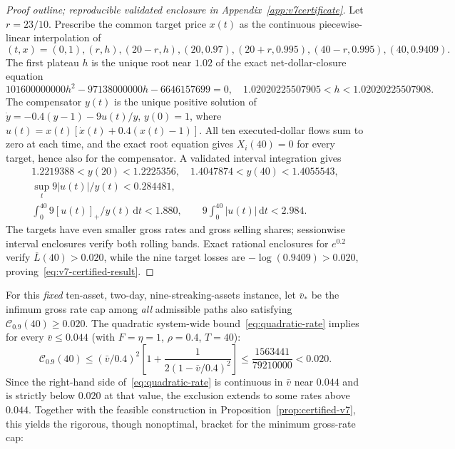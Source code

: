 \documentclass[11pt]{article}
\numberwithin{equation}{section}
\theoremstyle{definition}
\theoremstyle{remark}
\newcommand{\Cris}{\mathcal{C}}
\newcommand{\dd}{\,\mathrm{d}}
\begin{document}
\begin{proof}[Proof outline; reproducible validated enclosure in Appendix~\ref{app:v7certificate}]
Let $r=23/10$. Prescribe the common target price $x(t)$ as the continuous piecewise-linear interpolation of
\begin{equation}\label{eq:v7-knots}
(t,x)=(0,1),(r,h),(20-r,h),(20,0.97),(20+r,0.995),(40-r,0.995),(40,0.9409).
\end{equation}
The first plateau $h$ is the unique root near $1.02$ of the exact net-dollar-closure equation
\begin{equation}\label{eq:v7-root}
101600000000h^2-97138000000h-6646157699=0,
\quad1.02020225507905<h<1.02020225507908.
\end{equation}
The compensator $y(t)$ is the unique positive solution of
$\dot y=-0.4(y-1)-9u(t)/y$, $y(0)=1$, where
$u(t)=x(t)[\dot x(t)+0.4(x(t)-1)]$.
All ten executed-dollar flows sum to zero at each time, and the exact root equation gives $X_i(40)=0$ for every target, hence also for the compensator. A validated interval integration gives
\begin{equation}\label{eq:v7-bounds}
\begin{gathered}
1.2219388<y(20)<1.2225356,\quad
1.4047874<y(40)<1.4055543,\\
\sup_t9|u(t)|/y(t)<0.284481,\\
\int_0^{40}9[u(t)]_+/y(t)\dd t<1.880,\qquad
9\int_0^{40}|u(t)|\dd t<2.984.
\end{gathered}
\end{equation}
The targets have even smaller gross rates and gross selling shares; sessionwise interval enclosures verify both rolling bands. Exact rational enclosures for $e^{0.2}$ verify $\overline L(40)>0.020$, while the nine target losses are $-\log(0.9409)>0.020$, proving~\eqref{eq:v7-certified-result}.
\end{proof}
For this \emph{fixed} ten-asset, two-day, nine-streaking-assets instance, let $\bar v_*$ be the infimum gross rate cap among \emph{all} admissible paths also satisfying $\Cris_{0.9}(40)\ge0.020$. The quadratic system-wide bound~\eqref{eq:quadratic-rate} implies for every $\bar v\le 0.044$ (with $F=\eta=1$, $\rho=0.4$, $T=40$):
\[
\Cris_{0.9}(40)\le (\bar v/0.4)^2
\left[1+\frac{1}{2(1-\bar v/0.4)^2}\right]
\le \frac{1563441}{79210000}<0.020.
\]
Since the right-hand side of~\eqref{eq:quadratic-rate} is continuous in $\bar v$ near $0.044$ and is strictly below $0.020$ at that value, the exclusion extends to some rates above $0.044$. Together with the feasible construction in Proposition~\ref{prop:certified-v7}, this yields the rigorous, though nonoptimal, bracket for the minimum gross-rate cap:
\end{document}
